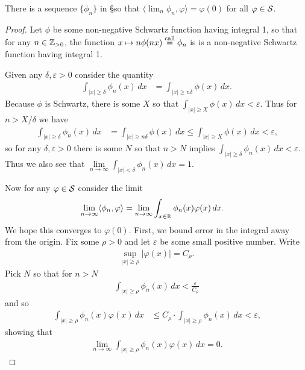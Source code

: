     \begin{thm}
      There is a sequence $\{\phi_n\}$ in \S so that $\langle\lim_n \phi_n,\varphi\rangle = \varphi(0)$ for all $\varphi\in\S$.
    \end{thm}
    \begin{proof}
      Let $\phi$ be some non-negative Schwartz function having integral 1, so that for any $n\in\Z_{>0}$, the function $x\mapsto n\phi(nx) \call \phi_n$ is is a non-negative Schwartz function having integral 1.
      
      Given any $\delta,\varepsilon>0$ consider the quantity
      \begin{align*}
        \int_{|x|\ge\delta} \phi_n(x) \,dx
        &= \int_{|x|\ge n\delta} \phi(x) \,dx \text{.}
      \end{align*}
      Because $\phi$ is Schwartz, there is some $X$ so that $\int_{|x|\ge X}\phi(x)\,dx<\varepsilon$.
      Thus for $n>X/\delta$ we have 
      \begin{align*}
        \int_{|x|\ge\delta} \phi_n(x) \,dx
        &= \int_{|x|\ge n\delta} \phi(x) \,dx
        \le \int_{|x|\ge X} \phi(x) \,dx
        <\varepsilon \text{,}
      \end{align*}
      so for any $\delta,\varepsilon>0$ there is some $N$ so that $n>N$ implies $\int_{|x|\ge\delta}\phi_n(x)\,dx<\varepsilon$.
      Thus we also see that $\lim\limits_{n\rightarrow\infty} \int_{|x|<\delta}\phi_n(x)\,dx=1$.

      Now for any $\varphi\in\S$ consider the limit
      \begin{align*}
        \lim_{n\rightarrow\infty}\langle\phi_n,\varphi\rangle 
        &=\lim_{n\rightarrow\infty}\int_{x\in\R} \phi_n(x)\varphi(x)\,dx\text{.}
      \end{align*}
      We hope this converges to $\varphi(0)$.
      First, we bound error in the integral away from the origin.
      Fix some $\rho>0$ and let $\varepsilon$ be some small positive number.
      Write
      \begin{align*}
        \sup_{|x|\ge\rho} |\varphi(x)| = C_\rho \text{.}
      \end{align*}
      Pick $N$ so that for $n>N$
      \begin{align*}
        \int_{|x|\ge\rho} \phi_n(x)\,dx
        < \frac\varepsilon{C_\rho}
      \end{align*}
      and so
      \begin{align*}
        \int_{|x|\ge\rho} \phi_n(x)\varphi(x)\,dx
        &\le C_\rho \cdot \int_{|x|\ge\rho} \phi_n(x)\,dx
        < \varepsilon \text{,}
      \end{align*}
      showing that
      \begin{align*}
        \lim_{n\rightarrow\infty} \int_{|x|\ge\rho} \phi_n(x)\varphi(x)\,dx
        = 0 \text{.}
      \end{align*}


\end{proof}
